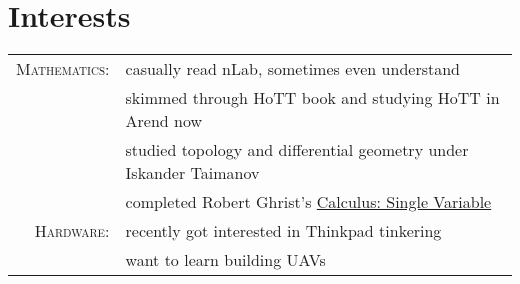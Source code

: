 \documentclass[a4paper,11pt]{article}
\begin{document}
  \section{Interests}
    \begin{tabular}{rl}
      \textsc{Mathematics:} & casually read nLab, sometimes even understand                      \\
                            & skimmed through HoTT book and studying HoTT in Arend now           \\
                            & studied topology and differential geometry under Iskander Taimanov \\
                            & completed Robert Ghrist's
                              \href{https://www.coursera.org/account/accomplishments/records/9Y3N9X2BMR}{Calculus:
                              Single Variable} \\
      \textsc{Hardware:} & recently got interested in Thinkpad tinkering \\
                         & want to learn building UAVs                   \\
    \end{tabular}
\end{document}

